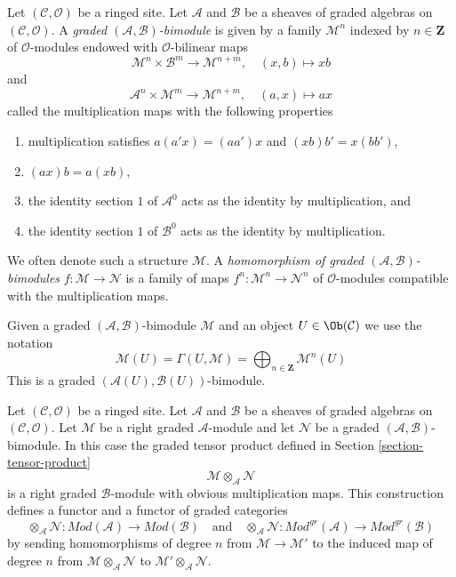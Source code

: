 \begin{definition}
\label{definition-bimodule}
Let $(\mathcal{C}, \mathcal{O})$ be a ringed site. Let $\mathcal{A}$
and $\mathcal{B}$ be a sheaves of graded algebras on
$(\mathcal{C}, \mathcal{O})$. A
{\it graded $(\mathcal{A}, \mathcal{B})$-bimodule}
is given by a family $\mathcal{M}^n$ indexed by $n \in \mathbf{Z}$
of $\mathcal{O}$-modules endowed with $\mathcal{O}$-bilinear maps
$$
\mathcal{M}^n \times \mathcal{B}^m \to \mathcal{M}^{n + m},\quad
(x, b) \longmapsto xb
$$
and
$$
\mathcal{A}^n \times \mathcal{M}^m \to \mathcal{M}^{n + m},\quad
(a, x) \longmapsto ax
$$
called the multiplication maps with the following properties
\begin{enumerate}
\item multiplication satisfies $a(a'x) = (aa')x$ and
$(xb)b' = x(bb')$,
\item $(ax)b = a(xb)$,
\item the identity section $1$ of $\mathcal{A}^0$ acts as the
identity by multiplication, and
\item the identity section $1$ of
$\mathcal{B}^0$ acts as the identity by multiplication.
\end{enumerate}
We often denote such a structure $\mathcal{M}$.
A {\it homomorphism of graded $(\mathcal{A}, \mathcal{B})$-bimodules}
$f : \mathcal{M} \to \mathcal{N}$ is a family of maps
$f^n : \mathcal{M}^n \to \mathcal{N}^n$
of $\mathcal{O}$-modules compatible with the multiplication maps.
\end{definition}

\noindent
Given a graded $(\mathcal{A}, \mathcal{B})$-bimodule $\mathcal{M}$
and an object $U \in \Ob(\mathcal{C})$ we use the notation
$$
\mathcal{M}(U) =
\Gamma(U, \mathcal{M}) =
\bigoplus\nolimits_{n \in \mathbf{Z}} \mathcal{M}^n(U)
$$
This is a graded $(\mathcal{A}(U), \mathcal{B}(U))$-bimodule.

\medskip\noindent
Let $(\mathcal{C}, \mathcal{O})$ be a ringed site. Let $\mathcal{A}$
and $\mathcal{B}$ be a sheaves of graded algebras on
$(\mathcal{C}, \mathcal{O})$. Let $\mathcal{M}$ be a right
graded $\mathcal{A}$-module and let $\mathcal{N}$ be a
graded $(\mathcal{A}, \mathcal{B})$-bimodule. In this case the
graded tensor product defined in Section \ref{section-tensor-product}
$$
\mathcal{M} \otimes_\mathcal{A} \mathcal{N}
$$
is a right graded $\mathcal{B}$-module with obvious multiplication maps.
This construction defines a functor and a functor of graded categories
$$
\otimes_\mathcal{A} \mathcal{N} :
\textit{Mod}(\mathcal{A})
\longrightarrow
\textit{Mod}(\mathcal{B})
\quad\text{and}\quad
\otimes_\mathcal{A} \mathcal{N} :
\textit{Mod}^{gr}(\mathcal{A})
\longrightarrow
\textit{Mod}^{gr}(\mathcal{B})
$$
by sending homomorphisms of degree $n$ from $\mathcal{M} \to \mathcal{M}'$
to the induced map of degree $n$ from
$\mathcal{M} \otimes_\mathcal{A} \mathcal{N}$ to
$\mathcal{M}' \otimes_\mathcal{A} \mathcal{N}$.


